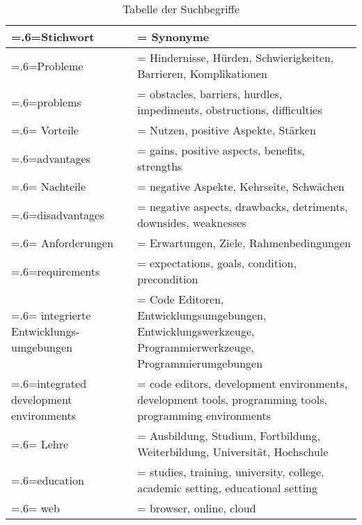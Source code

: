 \begin{table}[htbp]
    \centering
    \begin{tabularx}{\textwidth}{| >{\hsize=.6\hsize\linewidth=\hsize}X |
            >{\hsize=1.4\hsize\linewidth=\hsize}X |}
        \hline
        Stichwort                           & Synonyme                                                                                                  \\
        \hline
        Probleme                            & Hindernisse, Hürden, Schwierigkeiten, Barrieren, Komplikationen                                           \\ problems                            & obstacles, barriers, hurdles, impediments, obstructions, difficulties \\
        \hline
        Vorteile                            & Nutzen, positive Aspekte, Stärken                                                                         \\ advantages                          & gains, positive aspects, benefits, strengths \\
        \hline
        Nachteile                           & negative Aspekte, Kehrseite, Schwächen                                                                    \\ disadvantages                       & negative aspects, drawbacks, detriments, downsides, weaknesses \\
        \hline
        Anforderungen                       & Erwartungen, Ziele, Rahmenbedingungen                                                                     \\ requirements                        & expectations, goals, condition, precondition \\
        \hline
        integrierte Entwicklungs-umgebungen & Code Editoren, Entwicklungsumgebungen, Entwicklungswerkzeuge, Programmierwerkzeuge, Programmierumgebungen \\ integrated development environments & code editors, development environments, development tools, programming tools, programming environments \\
        \hline
        Lehre                               & Ausbildung, Studium, Fortbildung, Weiterbildung, Universität, Hochschule                                  \\ education                           & studies, training, university, college, academic setting, educational setting  \\
        \hline
        web                                 & browser, online, cloud
    \end{tabularx}
    \caption{Tabelle der Suchbegriffe}
    \label{table:search-terms}
\end{table}


